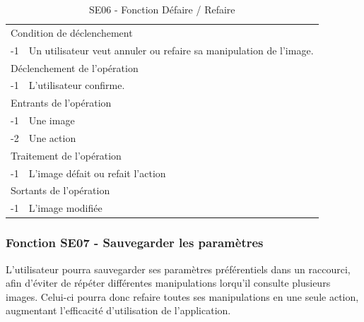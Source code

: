 \documentclass[a4paper]{article}
\begin{document}
\begin{table}[H]
  \centering
   \small
	\begin{tabular}{|c|p{12cm}|}
   		\hline
   			\rowcolor{lightgray}\multicolumn{2}{|c|}{\textbf{SE06 - Fonction Défaire / Refaire}} \\
   		\hline
   			\multicolumn{2}{|l|}{Condition de d\'eclenchement} \\
   		\hline
   			-1 & Un utilisateur veut annuler ou refaire sa manipulation de l'image. \\
   		\hline
   			\multicolumn{2}{|l|}{D\'eclenchement de l'op\'eration} \\
   		\hline
   			-1 & L'utilisateur confirme. \\
   		\hline
   			\multicolumn{2}{|l|}{Entrants de l'op\'eration} \\
   		\hline
        	-1 & Une image \\
   			-2 & Une action \\ 	
        \hline
   			\multicolumn{2}{|l|}{Traitement de l'op\'eration} \\
  		\hline
   			-1 & L'image défait ou refait l'action \\
   		\hline
   			\multicolumn{2}{|l|}{Sortants de l'op\'eration} \\
   		\hline
   			-1 & L'image modifiée \\
   		\hline
	\end{tabular}
  \caption{SE06 - Fonction Défaire / Refaire}
  \normalsize
  \label{tab:visu_img_undo_redo}
\end{table}



\subsubsection{Fonction SE07 - Sauvegarder les paramètres}

L'utilisateur pourra sauvegarder ses paramètres préférentiels dans un raccourci, afin d'éviter de répéter différentes manipulations lorqu'il consulte plusieurs images. Celui-ci pourra donc refaire toutes ses manipulations en une seule action, augmentant l'efficacité d'utilisation de l'application.
\end{document}
